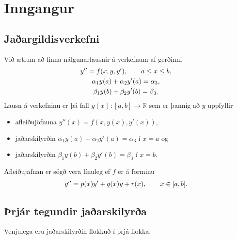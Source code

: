 \documentclass[letterpaper,10pt,icelandic]{sphinxmanual}
\begin{document}
\section{Inngangur}
\label{kafli07:inngangur}

\subsection{Jaðargildisverkefni}
\label{kafli07:id1}
Við ætlum að finna nálgunarlausnir á verkefnum af gerðinni
\begin{gather}
\begin{split}\begin{gathered}
    y''=f(x,y,y'), \qquad a\leq x\leq b,\\
\alpha_1y(a)+\alpha_2 y'(a)=\alpha_3,\\
\beta_1 y(b)+\beta_2y'(b)=\beta_3.
  \end{gathered}\end{split}\notag
\end{gather}
Lausn á verkefninu er þá fall \(y(x):[a,b]\to \mathbb R\) sem er þannig að \(y\)
uppfyllir
\begin{itemize}
\item {} 
afleiðujöfnuna \(y''(x) = f(x,y(x),y'(x))\),

\item {} 
jaðarskilyrðin \(\alpha_1y(a)+\alpha_2 y'(a)=\alpha_3\) í \(x=a\) og

\item {} 
jaðarskilyrðin \(\beta_1 y(b)+\beta_2y'(b)=\beta_3\) í \(x=b\).

\end{itemize}

Afleiðujafnan er sögð vera línuleg ef \(f\) er á forminu
\begin{gather}
\begin{split}y''=p(x)y'+q(x)y+r(x), \qquad x\in [a,b].\end{split}\notag
\end{gather}

\subsection{Þrjár tegundir jaðarskilyrða}
\label{kafli07:rjar-tegundir-jaarskilyra}\label{kafli07:index-1}
Venjulega eru jaðarskilyrðin flokkuð í þrjá flokka.
\end{document}
